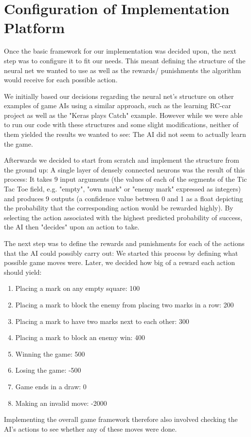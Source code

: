 \section{Configuration of Implementation Platform}

Once the basic framework for our implementation was decided upon, the next step was to configure it to fit our needs. This meant defining the structure of the neural net we wanted to use as well as the rewards/ punishments the algorithm would receive for each possible action.

We initially based our decisions regarding the neural net's structure on other examples of game AIs using a similar approach, such as the learning RC-car project as well as the "Keras plays Catch" example\cite{Santana17}. However while we were able to run our code with these structures and some slight modifications, neither of them yielded the results we wanted to see: The AI did not seem to actually learn the game.

Afterwards we decided to start from scratch and implement the structure from the ground up: A single layer of densely connected neurons was the result of this process: It takes 9 input arguments (the values of each of the segments of the Tic Tac Toe field, e.g. "empty", "own mark" or "enemy mark" expressed as integers) and produces 9 outputs (a confidence value between 0 and 1 as a float depicting the probability that the corresponding action would be rewarded highly). By selecting the action associated with the highest predicted probability of success, the AI then "decides" upon an action to take.

The next step was to define the rewards and punishments for each of the actions that the AI could possibly carry out: We started this process by defining what possible game moves were. Later, we decided how big of a reward each action should yield:

\begin{enumerate}
	\item Placing a mark on any empty square: 100
	\item Placing a mark to block the enemy from placing two marks in a row: 200
	\item Placing a mark to have two marks next to each other: 300
	\item Placing a mark to block an enemy win: 400
	\item Winning the game: 500
	\item Losing the game: -500
	\item Game ends in a draw: 0
	\item Making an invalid move: -2000
\end{enumerate}

Implementing the overall game framework therefore also involved checking the AI's actions to see whether any of these moves were done.